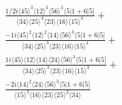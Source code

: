 \documentclass[varwidth, border=5pt]{standalone}
\begin{document}
\begin{my}
$\begin{gathered}
\scriptscriptstyle\frac{1/2i\langle45\rangle^3\langle12\rangle^3\langle56\rangle^3\langle5|1+6|5]}{\langle34\rangle\langle25\rangle^4\langle23\rangle\langle16\rangle\langle15\rangle^4}+\\
\scriptscriptstyle\frac{-1i\langle45\rangle^2\langle12\rangle^2\langle14\rangle\langle56\rangle^3\langle5|1+6|5]}{\langle34\rangle\langle25\rangle^3\langle23\rangle\langle16\rangle\langle15\rangle^4}+\\
\scriptscriptstyle\frac{1i\langle45\rangle\langle12\rangle\langle14\rangle\langle24\rangle\langle56\rangle^3\langle5|1+6|5]}{\langle34\rangle\langle25\rangle^3\langle23\rangle\langle16\rangle\langle15\rangle^3}+\\
\scriptscriptstyle\frac{-2i\langle14\rangle^2\langle24\rangle\langle56\rangle^3\langle5|1+6|5]}{\langle15\rangle^3\langle16\rangle\langle23\rangle\langle25\rangle^2\langle34\rangle}\phantom{+}
\end{gathered}$
\end{my}
\end{document}
